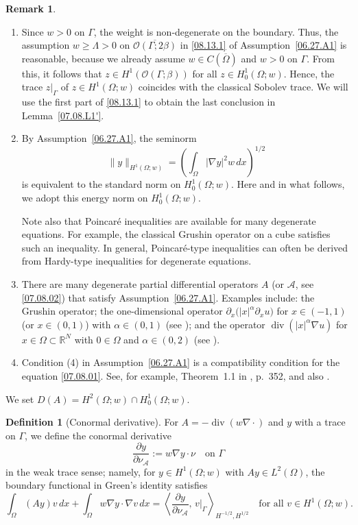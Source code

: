 \documentclass[preprint,12pt]{elsarticle}
\theoremstyle{definition}   %
\newtheorem{definition}[theorem]{Definition}
\newtheorem{remark}[theorem]{Remark}
\numberwithin{equation}{section}
\def\pt{\partial}
\def\pt{\partial}
\def\f{\frac}
\def\mcA{\mathcal{A}}
\DeclareMathOperator{\Div}{div}
\begin{document}
\begin{remark}\label{07.08.R1}\
\begin{enumerate}
\item Since $w>0$ on $\Gamma$, the weight is non-degenerate on the boundary. Thus, the assumption $w\geq \Lambda>0$ on $\overline{\mathcal{O}(\Gamma;2\beta)}$ in \eqref{08.13.1} of Assumption~\ref{06.27.A1} is reasonable, because we already assume $w\in C(\overline{\Omega})$ and $w>0$ on $\Gamma$. From this, it follows that $z\in H^1(\mathcal{O}(\Gamma;\beta))$ for all $z\in H^1_0(\Omega;w)$. Hence, the trace $z|_{\Gamma}$ of $z\in H^1(\Omega;w)$ coincides with the classical Sobolev trace. We will use the first part of \eqref{08.13.1} to obtain the last conclusion in Lemma~\ref{07.08.L1'}.
\item By Assumption~\ref{06.27.A1}, the seminorm
\[
\|y\|_{H^1(\Omega;w)}=\left(\int_\Omega |\nabla y|^2 w\, dx\right)^{1/2}
\]
is equivalent to the standard norm on $H^1_0(\Omega;w)$. Here and in what follows, we adopt this energy norm on $H^1_0(\Omega;w)$.

Note also that Poincaré inequalities are available for many degenerate equations. For example, the classical Grushin operator on a cube satisfies such an inequality. In general, Poincaré-type inequalities can often be derived from Hardy-type inequalities for degenerate equations.
\item There are many degenerate partial differential operators $A$ (or $\mathcal{A}$, see \eqref{07.08.02}) that satisfy Assumption~\ref{06.27.A1}. Examples include: the Grushin operator; the one-dimensional operator $\partial_x\!\big(|x|^\alpha \partial_x u\big)$ for $x\in (-1,1)$ (or $x\in (0,1)$) with $\alpha\in (0,1)$ (see \cite{Cannarsa1}); and the operator $\operatorname{div}(|x|^\alpha \nabla u)$ for $x\in \Omega\subset\mathbb{R}^N$ with $0\in \Omega$ and $\alpha\in (0,2)$ (see \cite{Yang1}).
\item Condition (4) in Assumption~\ref{06.27.A1} is a compatibility condition for the equation \eqref{07.08.01}. See, for example, Theorem~1.1 in \cite{Fattorini1}, p.~352, and also \cite{Lasiecka,Lasiecka1,Lasiecka2}.
\end{enumerate}
\end{remark}

We set $D(A) = H^2(\Omega;w)\cap H^1_0(\Omega;w)$.

\begin{definition}[Conormal derivative]\label{def:conormal}
For $A=-\Div(w\nabla\cdot)$ and $y$ with a trace on $\Gamma$, we define the conormal derivative
\[
\f{\pt y}{\pt \nu_\mcA}:=w\nabla y\cdot \nu \quad \text{on }\Gamma
\]
in the weak trace sense; namely, for $y\in H^1(\Omega;w)$ with $Ay\in L^2(\Omega)$, the boundary functional in Green's identity satisfies
\[
\int_\Omega (Ay)v\,dx+\int_\Omega w\nabla y\cdot\nabla v\,dx=\left\langle \f{\pt y}{\pt \nu_\mcA},\, v|_\Gamma\right\rangle_{H^{-1/2},H^{1/2}}
\quad \text{for all }v\in H^1(\Omega;w).
\]
\end{definition}
\end{document}
